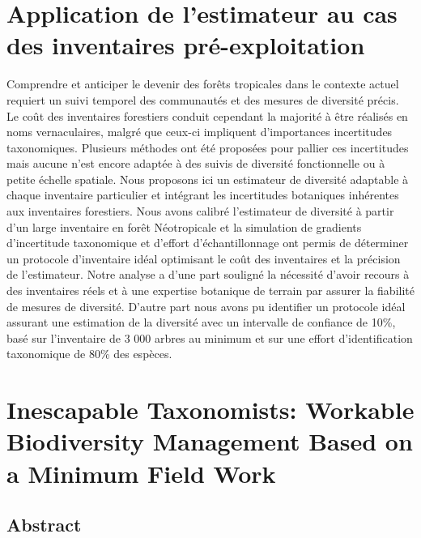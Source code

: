 \documentclass[
  11pt,
  french,
  A4paper,
  extrafontsizes,onecolumn,openright
  ]{memoir}
\begin{document}
\section{Application de l'estimateur au cas des inventaires
pré-exploitation}\label{application-de-lestimateur-au-cas-des-inventaires-pre-exploitation}

Comprendre et anticiper le devenir des forêts tropicales dans le
contexte actuel requiert un suivi temporel des communautés et des
mesures de diversité précis. Le coût des inventaires forestiers conduit
cependant la majorité à être réalisés en noms vernaculaires, malgré que
ceux-ci impliquent d'importances incertitudes taxonomiques. Plusieurs
méthodes ont été proposées pour pallier ces incertitudes mais aucune
n'est encore adaptée à des suivis de diversité fonctionnelle ou à petite
échelle spatiale. Nous proposons ici un estimateur de diversité
adaptable à chaque inventaire particulier et intégrant les incertitudes
botaniques inhérentes aux inventaires forestiers. Nous avons calibré
l'estimateur de diversité à partir d'un large inventaire en forêt
Néotropicale et la simulation de gradients d'incertitude taxonomique et
d'effort d'échantillonnage ont permis de déterminer un protocole
d'inventaire idéal optimisant le coût des inventaires et la précision de
l'estimateur. Notre analyse a d'une part souligné la nécessité d'avoir
recours à des inventaires réels et à une expertise botanique de terrain
par assurer la fiabilité de mesures de diversité. D'autre part nous
avons pu identifier un protocole idéal assurant une estimation de la
diversité avec un intervalle de confiance de 10\%, basé sur l'inventaire
de 3 000 arbres au minimum et sur une effort d'identification
taxonomique de 80\% des espèces.

\newpage

\section*{Inescapable Taxonomists: Workable Biodiversity Management
Based on a Minimum Field
Work}\label{inescapable-taxonomists-workable-biodiversity-management-based-on-a-minimum-field-work}

\subsection{Abstract}\label{abstract}
\end{document}
